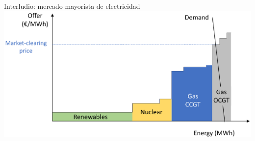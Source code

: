 \documentclass[aspectratio=169, usenames,svgnames,dvipsnames]{beamer}
\begin{document}

\begin{frame}{Interludio: \hspace{6mm}mercado mayorista de electricidad}    
\vspace{6mm}
    \hspace{3mm}
    \includegraphics[width=0.9\linewidth]{../figs/merit_order_curve.pdf}
\end{frame}
\end{document}

